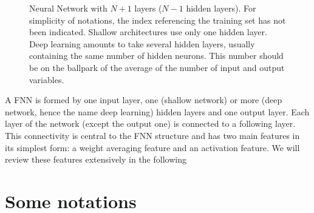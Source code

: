 \begin{figure}[H]
\begin{center}
\caption{\label{fig:1}Neural Network with $N+1$ layers ($N-1$ hidden layers). For simplicity of notations, the index referencing the training set has not been indicated. Shallow architectures use only one hidden layer. Deep learning amounts to take several hidden layers, usually containing the same number of hidden neurons. This number should be on the ballpark of the average of the number of input and output variables.}
\end{center}
\end{figure}

A FNN is formed by one input layer, one (shallow network) or more (deep network, hence the name deep learning) hidden layers and one output layer. Each layer of the network (except the output one) is connected to a following layer. This connectivity is central to the FNN structure and has two main features in its simplest form: a weight averaging feature and an activation feature. We will review these features extensively in the following

\section{Some notations}

